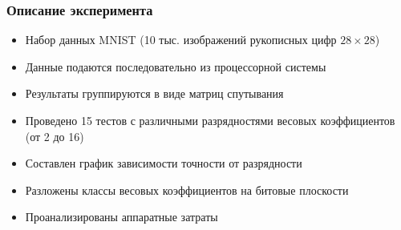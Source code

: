 \begin{frame}[t]
\frametitle{Описание эксперимента}
\begin{itemize}
    \item Набор данных MNIST (10 тыс. изображений рукописных цифр $28 \times 28$)
    \item Данные подаются последовательно из процессорной системы
    \item Результаты группируются в виде матриц спутывания
    \item Проведено 15 тестов с различными разрядностями весовых коэффициентов (от 2 до 16)
    \item Составлен график зависимости точности от разрядности
    \item Разложены классы весовых коэффициентов на битовые плоскости
    \item Проанализированы аппаратные затраты
\end{itemize}

\end{frame}

